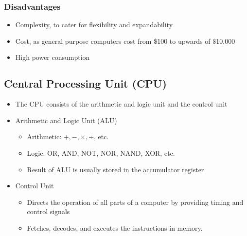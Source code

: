 \documentclass[11pt]{article}
\begin{document}
\subsubsection{Disadvantages}
\label{sec:org1ce8965}
\begin{itemize}
\item Complexity, to cater for flexibility and expandability
\item Cost, as general purpose computers cost from \$100 to upwards of \(\$\)10,000
\item High power consumption
\end{itemize}

\subsection{Central Processing Unit (CPU)}
\label{sec:org4f50d51}
\begin{itemize}
\item The CPU consists of the arithmetic and logic unit and the control unit
\item Arithmetic and Logic Unit (ALU)
\begin{itemize}
\item Arithmetic: \(+, -, \times, \div\), etc.
\item Logic: OR, AND, NOT, NOR, NAND, XOR, etc.
\item Result of ALU is usually stored in the accumulator register
\end{itemize}
\item Control Unit
\begin{itemize}
\item Directs the operation of all parts of a computer by providing timing and control signals
\item Fetches, decodes, and executes the instructions in memory.
\end{itemize}
\end{itemize}
\end{document}
